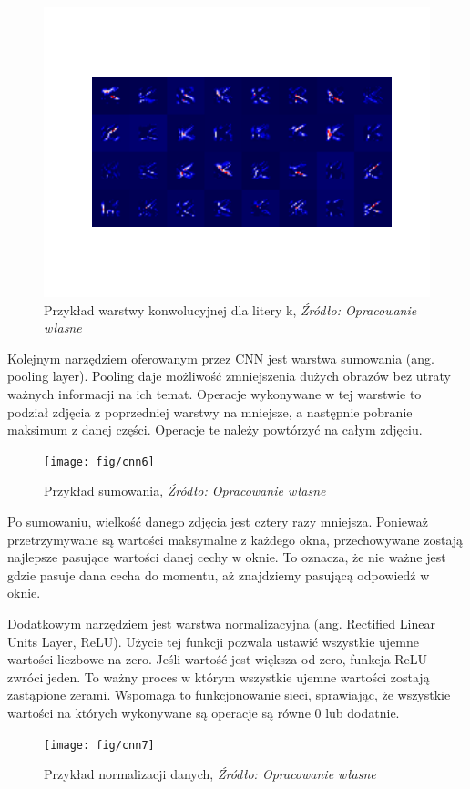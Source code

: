 \documentclass[brudnopis]{xmgr}
\begin{document}
\begin{figure}[!tbh]
\centering
\includegraphics[width=.7\hsize]{fig/figure_1}
\caption{Przykład warstwy konwolucyjnej dla litery k, \emph{Źródło: Opracowanie własne}}
\end{figure}

Kolejnym narzędziem oferowanym przez CNN jest warstwa sumowania (ang. pooling layer). Pooling daje możliwość zmniejszenia dużych obrazów bez utraty ważnych informacji na ich temat. Operacje wykonywane w tej warstwie to podział zdjęcia z poprzedniej warstwy na mniejsze, a następnie pobranie maksimum z danej części. Operacje te należy powtórzyć na całym zdjęciu.

\begin{figure}[!tbh]
\centering
\texttt{[image: fig/cnn6]}
\caption{Przykład sumowania, \emph{Źródło: Opracowanie własne}}
\end{figure}
\newpage

Po sumowaniu, wielkość danego zdjęcia jest cztery razy mniejsza. Ponieważ przetrzymywane są wartości maksymalne z każdego okna, przechowywane zostają najlepsze pasujące wartości danej cechy w oknie. To oznacza, że nie ważne jest gdzie pasuje dana cecha do momentu, aż znajdziemy pasującą odpowiedź w oknie.

Dodatkowym narzędziem jest warstwa normalizacyjna (ang. Rectified Linear Units Layer, ReLU). Użycie tej funkcji pozwala ustawić wszystkie ujemne wartości liczbowe na zero. Jeśli wartość jest większa od zero, funkcja ReLU zwróci jeden. To ważny proces w którym wszystkie ujemne wartości zostają zastąpione zerami. Wspomaga to funkcjonowanie sieci, sprawiając, że wszystkie wartości na których wykonywane są operacje są równe 0 lub dodatnie.

\begin{figure}[!tbh]
\centering
\texttt{[image: fig/cnn7]}
\caption{Przykład normalizacji danych, \emph{Źródło: Opracowanie własne}}
\end{figure}
\end{document}
